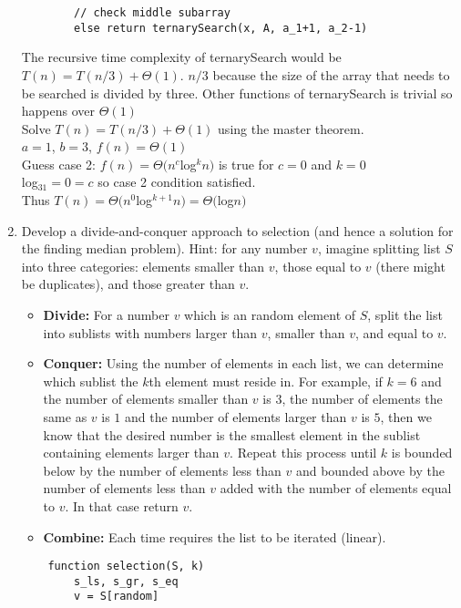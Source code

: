 \documentclass{article}
\begin{document}
\begin{enumerate}
\begin{lstlisting}
        // check middle subarray
        else return ternarySearch(x, A, a_1+1, a_2-1)
            \end{lstlisting}
            The recursive time complexity of ternarySearch would be $T(n)=T(n/3)+\Theta(1)$. $n/3$ because the size of the array that needs to be searched is divided by three. Other functions of ternarySearch is trivial so happens over $\Theta(1)$\\
            Solve $T(n)=T(n/3)+\Theta(1)$ using the master theorem.\\
            $a = 1$, $b = 3$, $f(n) = \Theta(1)$\\
            Guess case 2: $f(n)=\Theta(n^c$log$^kn)$ is true for $c=0$ and $k=0$\\
            log$_31 =0= c$ so case 2 condition satisfied.\\
            Thus $T(n)=\Theta(n^0$log$^{k+1}n) = \Theta($log$n)$
        \item Develop a divide-and-conquer approach to selection (and hence a solution for the finding median problem). Hint: for any number $v$, imagine splitting list $S$ into three categories: elements smaller than $v$, those equal to $v$ (there might be duplicates), and those greater than $v$. 
            \begin{itemize}
                \item \textbf{Divide:} For a number $v$ which is an random element of $S$, split the list into sublists with numbers larger than $v$, smaller than $v$, and equal to $v$.
                \item \textbf{Conquer:} Using the number of elements in each list, we can determine which sublist the $k$th element must reside in. For example, if $k=6$ and the number of elements smaller than $v$ is $3$, the number of elements the same as $v$ is $1$ and the number of elements larger than $v$ is $5$, then we know that the desired number is the smallest element in the sublist containing elements larger than $v$. Repeat this process until $k$ is bounded below by the number of elements less than $v$ and bounded above by the number of elements less than $v$ added with the number of elements equal to $v$. In that case return $v$.
                \item \textbf{Combine:} Each time requires the list to be iterated (linear).
            \end{itemize}
            \begin{lstlisting}
    function selection(S, k)
        s_ls, s_gr, s_eq
        v = S[random]

\end{lstlisting}
\end{enumerate}
\end{document}
